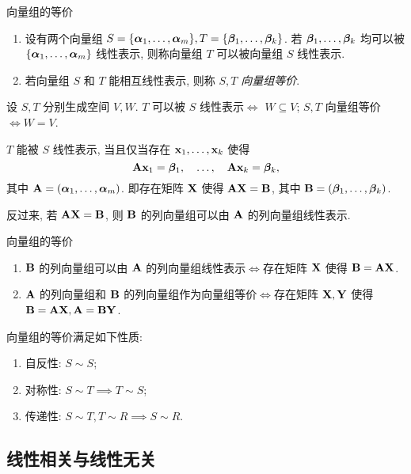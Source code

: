 \begin{frame}{向量组的等价}
	\onslide<+->
	\begin{definition}
		\begin{enumerate}
			\item 设有两个向量组 $S=\{{\boldsymbol{\alpha}}_1,\dots,{\boldsymbol{\alpha}}_m\}, T=\{{\boldsymbol{\beta}}_1,\dots,{\boldsymbol{\beta}}_k\}$.
			若 ${\boldsymbol{\beta}}_1,\dots,{\boldsymbol{\beta}}_k$ 均可以被 $\{{\boldsymbol{\alpha}}_1,\dots,{\boldsymbol{\alpha}}_m\}$ 线性表示, 则称向量组 $T$ 可以被向量组 $S$ 线性表示.
			\item 若向量组 $S$ 和 $T$ 能相互线性表示, 则称 $S,T$ \emph{向量组等价}.
		\end{enumerate}
	\end{definition}
	\onslide<+->
	设 $S,T$ 分别生成空间 $V,W$.
	\onslide<+->
	$T$ 可以被 $S$ 线性表示$\iff$ $W\subseteq V$;  $S,T$ 向量组等价$\iff W=V$.

	\onslide<+->
	$T$ 能被 $S$ 线性表示, 当且仅当存在 ${\mathbf{x}}_1,\dots,{\mathbf{x}}_k$ 使得
	\[{\mathbf{A}}{\mathbf{x}}_1={\boldsymbol{\beta}}_1,\quad\dots,\quad{\mathbf{A}}{\mathbf{x}}_k={\boldsymbol{\beta}}_k,\]
	其中 ${\mathbf{A}}=({\boldsymbol{\alpha}}_1,\dots,{\boldsymbol{\alpha}}_m)$.
	\onslide<+->
	即存在矩阵 ${\mathbf{X}}$ 使得 ${\mathbf{A}}{\mathbf{X}}={\mathbf{B}}$, 其中 ${\mathbf{B}}=({\boldsymbol{\beta}}_1,\dots,{\boldsymbol{\beta}}_k)$.

	\onslide<+->
	反过来, 若 ${\mathbf{A}}{\mathbf{X}}={\mathbf{B}}$, 则 ${\mathbf{B}}$ 的列向量组可以由 ${\mathbf{A}}$ 的列向量组线性表示.
\end{frame}


\begin{frame}{向量组的等价}
	\onslide<+->
	\begin{theorem}
		\begin{enumerate}
			\item ${\mathbf{B}}$ 的列向量组可以由 ${\mathbf{A}}$ 的列向量组线性表示$\iff$存在矩阵 ${\mathbf{X}}$ 使得 ${\mathbf{B}}={\mathbf{A}}{\mathbf{X}}$.
			\item ${\mathbf{A}}$ 的列向量组和 ${\mathbf{B}}$ 的列向量组作为向量组等价$\iff$存在矩阵 ${\mathbf{X}},{\mathbf{Y}}$ 使得 ${\mathbf{B}}={\mathbf{A}}{\mathbf{X}},{\mathbf{A}}={\mathbf{B}}{\mathbf{Y}}$.
		\end{enumerate}
	\end{theorem}
	\onslide<+->
	\begin{proposition}
		向量组的等价满足如下性质:
		\begin{enumerate}
			\item 自反性: $S\sim S$;
			\item 对称性: $S\sim T\implies T\sim S$;
			\item 传递性: $S\sim T,T\sim R\implies S\sim R$.
		\end{enumerate}
	\end{proposition}
\end{frame}


\subsection{线性相关与线性无关}

